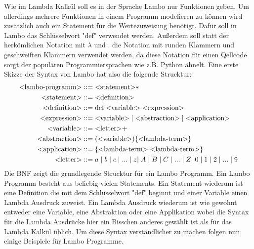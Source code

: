 \documentclass[ngerman]{article}
\begin{document}
Wie im Lambda Kalkül soll es in der Sprache Lambo nur Funktionen geben. 
Um allerdings mehrere Funktionen in einem Programm modelieren zu können wird zusätzlich auch ein Statement für die Wertezuweisung benötigt. Dafür soll in Lambo das Schlüsselwort "def" verwendet werden. Außerdem soll statt der herkömlichen Notation mit $\lambda$ und . die Notation mit runden Klammern und geschweiften Klammern verwendet werden, da diese Notation für einen Qellcode sorgt der populären Programmiersprachen wie z.B. Python ähnelt.
Eine erste Skizze der Syntax von Lambo hat also die folgende Strucktur:
\begin{align*}
    \text{\textless lambo-programm\textgreater} & ::= \text{\textless statement\textgreater}* \\
    \text{\textless statement\textgreater} & ::= \text{\textless definition\textgreater} \\
    \text{\textless definition\textgreater} & ::= \text{def} \; \text{\textless variable\textgreater} \; \text{\textless expression\textgreater}\\
    \text{\textless expression\textgreater} & ::= \text{\textless variable\textgreater} \; | \; \text{\textless abstraction\textgreater} \; | \; \text{\textless application\textgreater}\\
    \text{\textless variable\textgreater} & ::= \text{\textless letter\textgreater +} \\
    \text{\textless abstraction\textgreater} & ::= (\text{\textless variable\textgreater})\{\text{\textless lambda-term\textgreater}\}\\
    \text{\textless application\textgreater} & ::= \{\text{\textless lambda-term\textgreater} \; \text{\textless lambda-term\textgreater}\} \\
    \text{\textless letter\textgreater} & ::= a \; | \; b \; | \; c \; | \; ... \; | \; z | \; A \; | \; B \; | \; C \; | \; ... \; | \; Z | \; 0 \; | \; 1 \; | \; 2 \; | \; ... \; | \; 9
\end{align*}
Die BNF zeigt die grundlegende Strucktur für ein Lambo Programm. Ein Lambo Programm besteht aus beliebig vielen Statements. Ein Statement wiederum ist eine Definition die mit dem Schlüsselwort "def" beginnt und einer Variable einen Lambda Ausdruck zuweist. Ein Lambda Ausdruck wiederum ist wie gewohnt entweder eine Variable, eine Abstraktion oder eine Applikation wobei die Syntax für die Lambda Ausdrücke hier ein Bisschen anderes gewählt ist als für das Lambda Kalkül üblich. Um diese Syntax verständlicher zu machen folgen nun einige Beispiele für Lambo Programme. \\ \\
\end{document}
